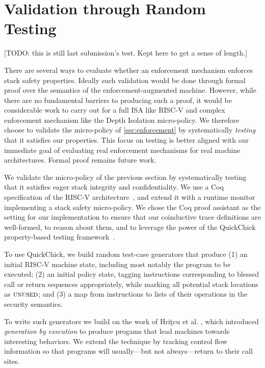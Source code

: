 \documentclass[10pt,conference]{ieeetran}%
\theoremstyle{definition}
\begin{document}
\section{Validation through Random Testing}
\label{sec:testing}

[TODO: this is still last submission's test. Kept here to get a sense of length.]

There are several ways to evaluate whether an enforcement mechanism enforces
stack safety properties. Ideally such validation would be done through formal proof over
the semantics of the enforcement-augmented machine.
However, while there are no fundamental barriers to producing such a proof,
it would be considerable work to carry out for a full ISA like RISC-V and
complex enforcement mechanism like the Depth Isolation micro-policy.
We therefore choose to validate the micro-policy of \cref{sec:enforcement} by
systematically \emph{testing} that it satisfies our properties.
This focus on testing is better aligned with our immediate
goal of evaluating real enforcement mechanisms for real machine architectures.
Formal proof remains future work.

We validate the micro-policy of the previous section by
systematically testing that it satisfies eager stack integrity and
confidentiality. We use a Coq specification of the RISC-V
architecture~\cite{Bourgeat2021AMF},
and extend it with a runtime monitor implementing a stack safety
micro-policy. We chose the Coq proof assistant as the setting for our implementation
to ensure that our coinductive trace definitions are well-formed, to reason about
them, and to leverage the power of the QuickChick property-based testing framework~\cite{Pierce:SF4}.

To use QuickChick, we build random test-case generators that produce
(1) an initial RISC-V machine state, including most notably
  the program to be executed;
(2)
  an initial policy state, tagging instructions corresponding to
  blessed call or return sequences appropriately, while marking
  all potential stack locations as $\textsc{unused}$; and
(3)
  a map from instructions to lists of their operations in the security semantics.

To write such generators we build on the work of
Hri\c{t}cu et al. \cite{TestingNI:ICFP, DBLP:journals/jfp/HritcuLSADHPV16}, which
introduced {\em generation by execution} to produce progams that lead
machines towards interesting behaviors. We extend the technique by tracking
control flow information so that programs will usually---but not always---return to their call sites.
\end{document}
